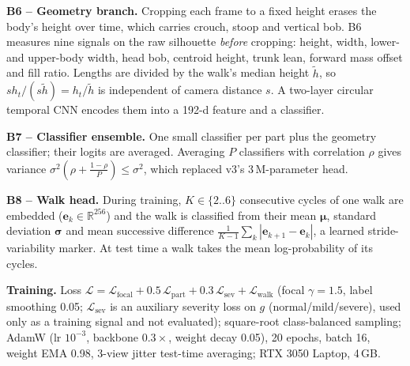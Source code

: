 \documentclass[conference]{IEEEtran}
\newcommand{\R}{\mathbb{R}}
\begin{document}
\textbf{B6 -- Geometry branch.} Cropping each frame to a fixed height erases the
body's height over time, which carries crouch, stoop and vertical bob. B6
measures nine signals on the raw silhouette \emph{before} cropping: height,
width, lower- and upper-body width, head bob, centroid height, trunk lean,
forward mass offset and fill ratio. Lengths are divided by the walk's median
height $\tilde h$, so $s h_t/(s\tilde h)=h_t/\tilde h$ is independent of camera
distance $s$. A two-layer circular temporal CNN encodes them into a 192-d
feature and a classifier.

\textbf{B7 -- Classifier ensemble.} One small classifier per part plus the
geometry classifier; their logits are averaged. Averaging $P$ classifiers with
correlation $\rho$ gives variance $\sigma^2(\rho+\frac{1-\rho}{P})\le\sigma^2$,
which replaced v3's 3\,M-parameter head.

\textbf{B8 -- Walk head.} During training, $K\in\{2..6\}$ consecutive cycles
of one walk are embedded ($\mathbf e_k\in\R^{256}$) and the walk is classified
from their mean $\boldsymbol\mu$, standard deviation $\boldsymbol\sigma$ and
mean successive difference $\frac1{K-1}\sum_k|\mathbf e_{k+1}-\mathbf e_k|$, a
learned stride-variability marker. At test time a walk takes the mean
log-probability of its cycles.

\textbf{Training.} Loss $\mathcal{L}=\mathcal{L}_{\text{focal}}+0.5\,
\mathcal{L}_{\text{part}}+0.3\,\mathcal{L}_{\text{sev}}+\mathcal{L}_{\text{walk}}$
(focal $\gamma=1.5$, label smoothing 0.05; $\mathcal{L}_{\text{sev}}$ is an
auxiliary severity loss on $g$ (normal/mild/severe), used only as a training
signal and not evaluated); square-root class-balanced
sampling; AdamW (lr $10^{-3}$, backbone $0.3\times$, weight decay 0.05), 20
epochs, batch 16, weight EMA 0.98, 3-view jitter test-time averaging; RTX 3050
Laptop, 4\,GB.

\end{document}
